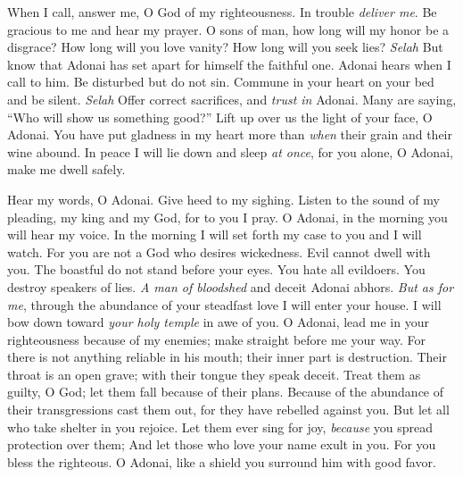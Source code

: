 \begin{biblechapter} %
 When I call, answer me, O God of my righteousness. 
In trouble \textit{deliver me}. 
Be gracious to me and hear my prayer.
\verse O sons of man, how long will my honor be a disgrace? 
How long will you love vanity? 
How long will you seek lies? \textit{Selah}
\verse But know that Adonai has set apart for himself the faithful one. 
Adonai hears when I call to him.
\verse Be disturbed but do not sin. 
Commune in your heart on your bed and be silent. \textit{Selah}
\verse Offer correct sacrifices, 
and \textit{trust in} Adonai.
\verse Many are saying, “Who will show us something good?” 
Lift up over us the light of your face, O Adonai.
\verse You have put gladness in my heart 
more than \textit{when} their grain and their wine abound.
\verse In peace I will lie down and sleep \textit{at once}, 
for you alone, O Adonai, make me dwell safely.
\end{biblechapter}

\begin{biblechapter} %
 Hear my words, O Adonai. 
Give heed to my sighing.
\verse Listen to the sound of my pleading, my king and my God, 
for to you I pray.
\verse O Adonai, in the morning you will hear my voice. 
In the morning I will set forth my case to you and I will watch.
\verse For you are not a God who desires wickedness. 
Evil cannot dwell with you.
\verse The boastful do not stand before your eyes. 
You hate all evildoers.
\verse You destroy speakers of lies. 
\textit{A man of bloodshed} and deceit Adonai abhors.
\verse \textit{But as for me}, through the abundance of your steadfast love 
I will enter your house. 
I will bow down toward \textit{your holy temple} in awe of you.
\verse O Adonai, lead me in your righteousness because of my enemies; 
make straight before me your way.
\verse For there is not anything reliable in his mouth; 
their inner part is destruction. 
Their throat is an open grave; 
with their tongue they speak deceit.
\verse Treat them as guilty, O God; 
let them fall because of their plans. 
Because of the abundance of their transgressions cast them out, 
for they have rebelled against you.
\verse But let all who take shelter in you rejoice. 
Let them ever sing for joy, 
\textit{because} you spread protection over them; 
And let those who love your name exult in you.
\verse For you bless the righteous. 
O Adonai, like a shield you surround him with good favor.
\end{biblechapter}

